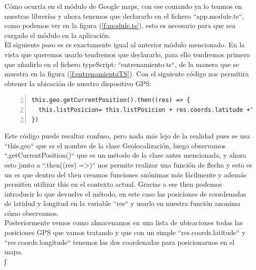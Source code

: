 \documentclass[a4paper, 11pt]{article}
\begin{document}
\begin{itemize}
                Cómo ocurría en el módulo de Google maps, con ese comando ya lo
                tenmos en nuestras librerías y ahora tenemos que
                declararlo en el fichero ``app.module.ts``, como podemos ver en
                la figura (\ref{f:module.ts}), esto es necesario para que sea
                cargado el módulo en la aplicación.\\

                El siguiente paso es es exactamente igual al anterior módulo
                mencionado. En la vista que queremos
                usarlo tendremos que declararlo, para ello tendremos primero que
                añadirlo en el fichero
                typeScript: ``entrenamiento.ts``, de la manera que se muestra en
                la figura (\ref{f:entrenamientoTS}). Con el siguiente código nos
                permitira obtener la ubicación de nuestro dispositivo GPS:\\

                \begin{lstlisting}[frame=single,numbers=left, numberstyle=\tiny, stepnumber=1, numbersep=-2pt]
this.geo.getCurrentPosition().then((res) => {
  this.listPosicion= this.listPosicion + res.coords.latitude +','+ res.coords.longitude +';';
})
                \end{lstlisting}


                Este código puede resultar confuso, pero nada más lejo de la realidad
                pues se usa ``this.geo`` que es el nombre de la clase Geolocalización,
                luego observamos ``.getCurrentPosition()`` que es un método de
                la clase antes mencionada, y ahora esto junto a ``.then((res) =>{})``
                nos permite realizar una función de flecha y esto es un es que
                dentro del then creamos funciones anónimas más fácilmente y
                además permiten utilizar this en el contexto actual. Gracias a
                ese then podemos introducir lo que devuelve el método, en este
                caso las posiciones de coordenadas de latidud y longitud en la
                variable ``res`` y usarlo en nuestra función anonima cómo
                observamos.\\

                Posteriormente vemos como almacenamos en una lista de ubicaciones
                todas las posiciones GPS que vamos tratando y que con un simple
                ``res.coords.latitude`` y ``res.coords.longitude`` tenemos las
                dos coordenadas para posicionarnos en el mapa.\\∫



\end{itemize}
\end{document}
